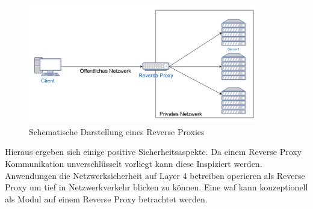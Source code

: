 \begin{figure}[!hbt]
    \centering
    \includegraphics[width=0.9\textwidth]{./images/reverse-Proxy.png}
    \caption{Schematische Darstellung eines Reverse Proxies}
    \label{fig:revprox}
\end{figure}

Hieraus ergeben sich einige positive Sicherheitsaspekte.
Da einem Reverse Proxy Kommunikation unverschlüsselt vorliegt kann diese Inspiziert werden.
Anwendungen die Netzwerksicherheit auf Layer 4 betreiben operieren als Reverse Proxy um tief in Netzwerkverkehr blicken zu können.
Eine \ac{waf} kann konzeptionell als Modul auf einem Reverse Proxy betrachtet werden\cite{WasIstReverse}.

\pagebreak